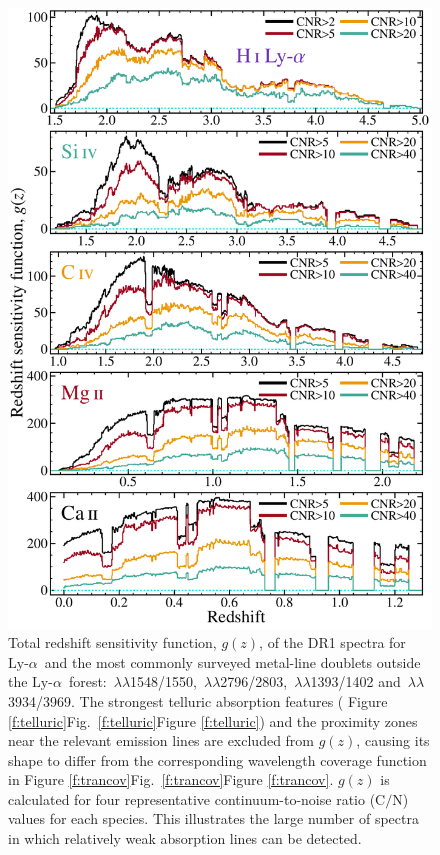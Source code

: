 \documentclass[fleqn,usenatbib,usedcolumn]{mnras}
\newcommand{\Fref}[1]{\ifhmode \ifnum\spacefactor=1001 Figure \ref{#1}\else Fig.\ \ref{#1}\fi \else Figure \ref{#1}\fi}
\newcommand{\CN}{\ensuremath{\textrm{C/N}}}
\newcommand{\lya}{\ensuremath{\textrm{Ly-}\alpha}}
\begin{document}
\begin{figure}
\begin{center}
\includegraphics[width=0.95\columnwidth]{DR1_gz.pdf}
\vspace{-1em}
\caption{Total redshift sensitivity function, $g(z)$, of the DR1 spectra for  \lya\ and the most commonly surveyed metal-line doublets outside the \lya\ forest: \,$\lambda\lambda$1548/1550, \,$\lambda\lambda$2796/2803, \,$\lambda\lambda$1393/1402 and \,$\lambda\lambda$3934/3969. The strongest telluric absorption features (\Fref{f:telluric}) and the proximity zones near the relevant emission lines are excluded from $g(z)$, causing its shape to differ from the corresponding wavelength coverage function in \Fref{f:trancov}. $g(z)$ is calculated for four representative continuum-to-noise ratio (\CN) values for each species. This illustrates the large number of spectra in which relatively weak absorption lines can be detected.}
\label{f:gz}
\end{center}
\end{figure}
\end{document}
